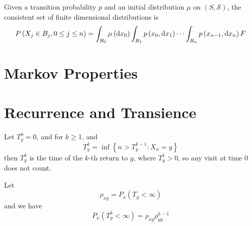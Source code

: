 \begin{remark}
	Given a transition probability $p$ and an initial distribution $\mu$ on $(S,\mathcal{S})$, the consistent set of finite dimensional distributions is
	\begin{equation}
		P\left(X_{j}\in B_{j},0\leq j\leq n\right)=\int_{B_{0}}\mu\left(\mathop{}\!\mathrm{d} x_{0}\right)\int_{B_{1}}p\left(x_{0},\mathop{}\!\mathrm{d} x_{1}\right)\cdots\int_{B_{n}}p\left(x_{n-1},\mathop{}\!\mathrm{d} x_{n}\right)
		F    \end{equation}
\end{remark}

\section{Markov Properties}

\begin{definition}

\end{definition}

\begin{theorem}

\end{theorem}

\begin{corollary}

\end{corollary}

\begin{theorem}

\end{theorem}

\section{Recurrence and Transience}

Let $T_{y}^{0}=0$, and for $k\geq 1$, and
\begin{equation}
	T_{y}^{k}=\inf\left\{n>T_{y}^{k-1}:X_{n}=y\right\}
\end{equation}
then $T_{y}^{k}$ is the time of the $k$-th return to $y$, where $T_{y}^{1}>0$, so any visit at time 0 does not count.

Let
\begin{equation}
	\rho_{x y}=P_{x}\left(T_{y}<\infty\right)
\end{equation}
and we have
\begin{equation}
	P_{x}\left(T_{y}^{k}<\infty\right)=\rho_{xy}\rho_{yy}^{k-1}
\end{equation}

